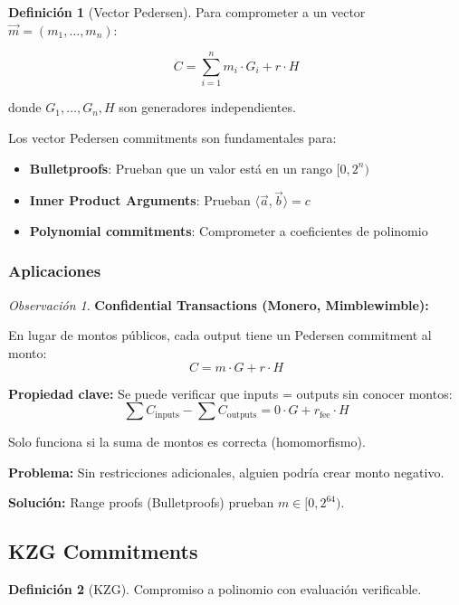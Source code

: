 \documentclass[11pt,a4paper,twoside,openright]{book}
\theoremstyle{definition}
\newtheorem{definition}{Definición}[chapter]
\theoremstyle{plain}
\theoremstyle{remark}
\newtheorem{remark}{Observación}[chapter]
\begin{document}
\begin{definition}[Vector Pedersen]
Para comprometer a un vector $\vec{m} = (m_1, \ldots, m_n)$:

\[ C = \sum_{i=1}^n m_i \cdot G_i + r \cdot H \]

donde $G_1, \ldots, G_n, H$ son generadores independientes.
\end{definition}

\begin{keyidea}
Los vector Pedersen commitments son fundamentales para:
\begin{itemize}
    \item \textbf{Bulletproofs}: Prueban que un valor está en un rango $[0, 2^n)$
    \item \textbf{Inner Product Arguments}: Prueban $\langle \vec{a}, \vec{b} \rangle = c$
    \item \textbf{Polynomial commitments}: Comprometer a coeficientes de polinomio
\end{itemize}
\end{keyidea}

\subsubsection{Aplicaciones}

\begin{remark}
\textbf{Confidential Transactions (Monero, Mimblewimble):}

En lugar de montos públicos, cada output tiene un Pedersen commitment al monto:
\[ C = m \cdot G + r \cdot H \]

\textbf{Propiedad clave:} Se puede verificar que inputs = outputs sin conocer montos:
\[ \sum C_{\text{inputs}} - \sum C_{\text{outputs}} = 0 \cdot G + r_{\text{fee}} \cdot H \]

Solo funciona si la suma de montos es correcta (homomorfismo).

\textbf{Problema:} Sin restricciones adicionales, alguien podría crear monto negativo.

\textbf{Solución:} Range proofs (Bulletproofs) prueban $m \in [0, 2^{64})$.
\end{remark}

\subsection{KZG Commitments}

\begin{definition}[KZG]
Compromiso a polinomio con evaluación verificable.
\end{definition}
\end{document}
